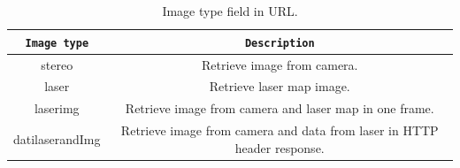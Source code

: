 \begin{table}[!h]
  \centering  
  \begin{tabular}{| c | c |}

    \hline
    \texttt{\bf Image type} &
    \texttt{\bf Description} \\ %

    \hline
    \parbox[t]{6.5cm}{\raggedright \small stereo } &
    \parbox[t]{6cm}{\raggedright \small
      Retrieve image from camera.} \\  [1ex]

    \hline
    \parbox[t]{6.5cm}{\raggedright \small laser } &
    \parbox[t]{6cm}{\raggedright \small
      Retrieve laser map image.} \\  [1ex]

    \hline
    \parbox[t]{6.5cm}{\raggedright \small  laserimg } &
    \parbox[t]{6cm}{\raggedright \small
      Retrieve image from camera and laser map in one frame.} \\  [1ex]

    \hline
    \parbox[t]{6.5cm}{\raggedright \small datilaserandImg } &
    \parbox[t]{6cm}{\raggedright \small
      Retrieve image from camera and data from laser in HTTP header response.} \\  [1ex]

    \hline

  \end{tabular}
  \caption{Image type field in URL.}
  \label{table:image_type}
\end{table}


